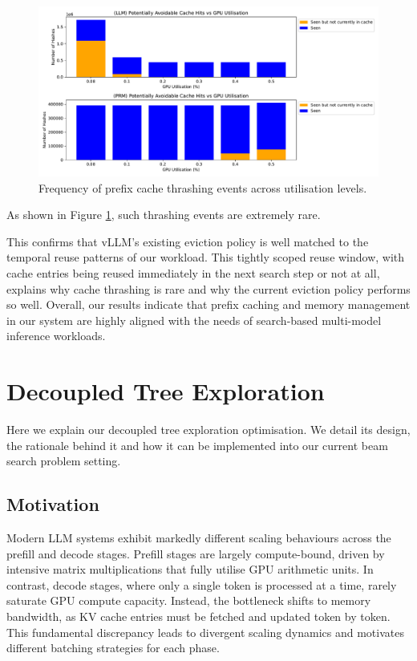 \documentclass[11pt,twoside]{report}
\begin{document}
\begin{figure}[htbp]
\centering
\includegraphics[width=\textwidth]{figures/kv_thrashing_stats.pdf}
\caption{Frequency of prefix cache thrashing events across utilisation levels.}
\label{fig:cache_thrashing}
\end{figure}

As shown in Figure \ref{fig:cache_thrashing}, such thrashing events are extremely rare. 

This confirms that vLLM's existing eviction policy is well matched to the temporal reuse patterns of our workload.
This tightly scoped reuse window, with cache entries being reused immediately in the next search step or not at all, explains why cache thrashing is rare and why the current eviction policy performs so well. 
Overall, our results indicate that prefix caching and memory management in our system are highly aligned with the needs of search-based multi-model inference workloads.

\chapter{Decoupled Tree Exploration}
Here we explain our decoupled tree exploration optimisation.
We detail its design, the rationale behind it and how it can be implemented into our current beam search problem setting.

\section{Motivation}
Modern LLM systems exhibit markedly different scaling behaviours across the prefill and decode stages. 
Prefill stages are largely compute-bound, driven by intensive matrix multiplications that fully utilise GPU arithmetic units. 
In contrast, decode stages, where only a single token is processed at a time, rarely saturate GPU compute capacity. 
Instead, the bottleneck shifts to memory bandwidth, as KV cache entries must be fetched and updated token by token. 
This fundamental discrepancy leads to divergent scaling dynamics and motivates different batching strategies for each phase.
\end{document}
